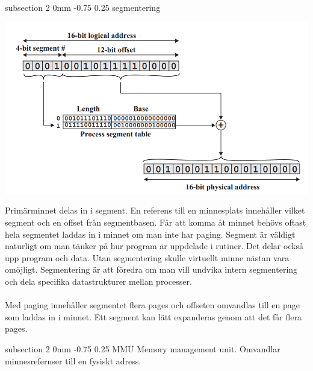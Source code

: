 \documentclass[a4paper,11pt]{article}
\makeatletter
\renewcommand{\subsection}{\@startsection
   {subsection}%
   {2}%
   {0mm}%
   {-0.75\baselineskip}%
   {0.25\baselineskip}%
   {\rmfamily\normalfont\slshape\normalsize}}%
\makeatother
\begin{document}
\subsection{segmentering}
\centerline{\includegraphics[scale=0.5]{segmentation}}
Primärminnet delas in i segment. En referens till en minnesplats innehåller vilket segment och en offset från segmentbasen. Får att komma åt minnet behövs oftast hela segmentet laddas in i minnet om man inte har paging. Segment är väldigt naturligt om man tänker på hur program är uppdelade i rutiner. Det delar också upp program och data. Utan segmentering skulle virtuellt minne nästan vara omöjligt. Segmentering är att föredra om man vill undvika intern segmentering och dela specifika datastrukturer mellan processer. \\ \\
Med paging innehåller segmentet flera pages och offseten omvandlas till en page som laddas in i minnet. Ett segment kan lätt expanderas genom att det får flera pages.

\subsection{MMU}
Memory management unit. Omvandlar minnesrefernser till en fysiskt adress.
\end{document}
